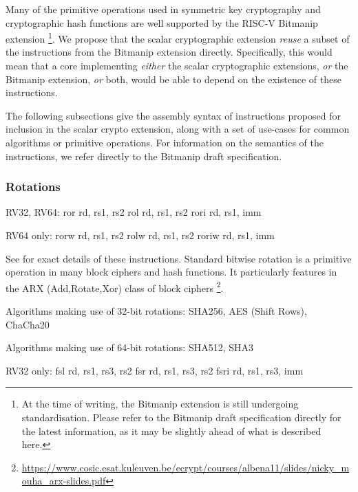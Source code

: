 Many of the primitive operations used in symmetric key cryptography
and cryptographic hash functions are well supported by the
RISC-V Bitmanip \cite{riscv:bitmanip:repo} extension
\footnote{
At the time of writing, the Bitmanip extension is still undergoing
standardisation.
Please refer to the Bitmanip draft specification
\cite{riscv:bitmanip:draft}
directly for the
latest information, as it may be slightly ahead of what is described
here.
}.
We propose that the scalar cryptographic extension {\em reuse} a
subset of the instructions from the Bitmanip extension directly.
Specifically, this would mean that
a core implementing
{\em either}
the scalar cryptographic extensions,
{\em or}
the Bitmanip extension,
{\em or}
both,
would be able to depend on the existence of these instructions.

The following subsections give the assembly syntax of instructions
proposed for inclusion in the scalar crypto extension, along with a
set of use-cases for common algorithms or primitive operations.
For information on the semantics of the instructions, we refer directly
to the Bitmanip draft specification.

\subsubsection{Rotations}

\begin{cryptobitmanipisa}
RV32, RV64:
    ror    rd, rs1, rs2
    rol    rd, rs1, rs2
    rori   rd, rs1, imm

RV64 only:
    rorw   rd, rs1, rs2
    rolw   rd, rs1, rs2
    roriw  rd, rs1, imm
\end{cryptobitmanipisa}

See \cite[Section 3.1.1]{riscv:bitmanip:draft} for exact details of
these instructions.
Standard bitwise rotation is a primitive operation in many block ciphers and
hash functions.
It particularly features in the ARX (Add,Rotate,Xor) class of
block ciphers
\footnote{\url{https://www.cosic.esat.kuleuven.be/ecrypt/courses/albena11/slides/nicky_mouha_arx-slides.pdf}}.

Algorithms making use of 32-bit rotations:
SHA256, AES (Shift Rows), ChaCha20

Algorithms making use of 64-bit rotations:
SHA512, SHA3

\begin{cryptobitmanipisa}
RV32 only:
    fsl   rd, rs1, rs3, rs2
    fsr   rd, rs1, rs3, rs2
    fsri  rd, rs1, rs3, imm
\end{cryptobitmanipisa}

